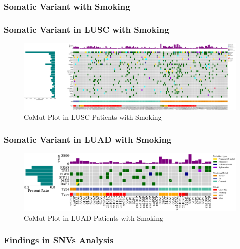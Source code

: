 \documentclass{beamer}
\begin{document}
    \subsubsection{Somatic Variant with Smoking}
    \begin{frame}
        \frametitle{Somatic Variant in LUSC with Smoking}

        \begin{figure}
            \includegraphics[width=\linewidth]{figures/Mutect2/BWA-SQC.Smoking.pdf}
            \caption{CoMut Plot in LUSC Patients with Smoking}
        \end{figure}
    \end{frame}

    \begin{frame}
        \frametitle{Somatic Variant in LUAD with Smoking}

        \begin{figure}
            \includegraphics[width=\linewidth]{figures/Mutect2/BWA-ADC.Smoking.pdf}
            \caption{CoMut Plot in LUAD Patients with Smoking}
        \end{figure}
    \end{frame}

    \begin{frame}
        \frametitle{Findings in SNVs Analysis}
    \end{frame}
\end{document}
